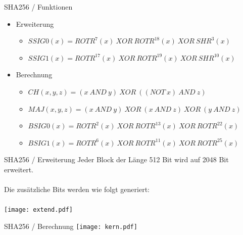 \documentclass{beamer}
\begin{document}
    \begin{frame}{SHA256 / Funktionen}
      \begin{itemize}
      \setlength{\itemsep}{20pt}
      \item Erweiterung
        \begin{itemize}
          \setlength{\itemsep}{10pt}
          \item $ SSIG0(x) = ROTR^{7}(x)~XOR~ROTR^{18}(x)~XOR~SHR^{3}(x) $
          \item $ SSIG1(x) = ROTR^{17}(x)~XOR~ROTR^{19}(x)~XOR~SHR^{10}(x) $
        \end{itemize}
      \item Berechnung
        \begin{itemize}
          \setlength{\itemsep}{10pt}
          \item $ CH( x, y, z) = (x~AND~y)~XOR~( (NOT~x)~AND~z) $
          \item $ MAJ( x, y, z) = (x~AND~y)~XOR~(x~AND~z)~XOR~(y~AND~z) $
          \item $ BSIG0(x) = ROTR^{2}(x)~XOR~ROTR^{13}(x)~XOR~ROTR^{22}(x) $
          \item $ BSIG1(x) = ROTR^{6}(x)~XOR~ROTR^{11}(x)~XOR~ROTR^{25}(x) $
        \end{itemize}
      \end{itemize}
    \end{frame}
    \begin{frame}{SHA256 / Erweiterung}
      Jeder Block der Länge 512 Bit wird auf 2048 Bit erweitert.\\
      ~\\
      Die zusätzliche Bits werden wie folgt generiert:\\
      ~\\
      \texttt{[image: extend.pdf]}
    \end{frame}
    \begin{frame}{SHA256 / Berechnung}
      \texttt{[image: kern.pdf]}
    \end{frame}
\end{document}

